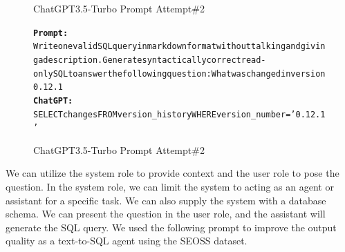 \begin{figure}[H]
    \begin{AIbox}{ChatGPT3.5-Turbo Prompt Attempt\#2}
        \vspace{-5px}
        \parbox{1\textwidth}{\scriptsize
        \begin{alltt} \larger
            {\bf Prompt:} \\ 
            Write one valid SQL query in markdown format without talking and giving a description. Generate syntactically correct read-only SQL to answer the following question: What was changed in version 0.12.1
            \\
            {\bf ChatGPT:} \\
            SELECT changes FROM version\_history WHERE version\_number = '0.12.1'
        \end{alltt}
        }
        \vspace{-5px}
    \end{AIbox}
    
    \caption{ChatGPT3.5-Turbo Prompt Attempt\#2}
\end{figure}

We can utilize the system role to provide context and the user role to pose the question. In the system role, we can limit the system to acting as an agent or assistant for a specific task. We can also supply the system with a database schema. We can present the question in the user role, and the assistant will generate the SQL query. We used the following prompt to improve the output quality as a text-to-SQL agent using the SEOSS dataset.


